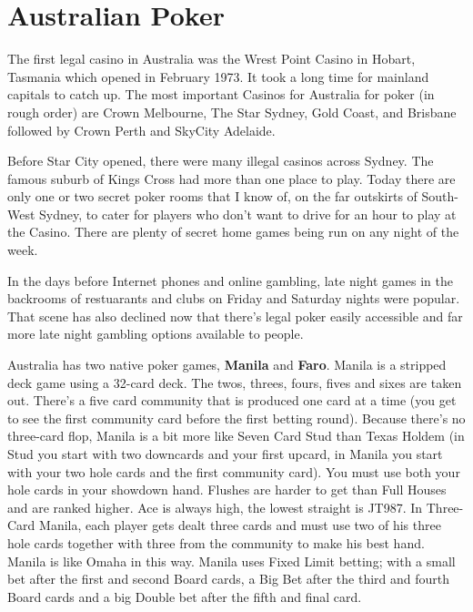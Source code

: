 \section{Australian Poker}

The first legal casino in Australia was the Wrest Point Casino in
Hobart, Tasmania which opened in February 1973. It took a long time
for mainland capitals to catch up. The most important Casinos for
Australia for poker (in rough order) are Crown Melbourne, The Star
Sydney, Gold Coast, and Brisbane followed by Crown Perth and SkyCity
Adelaide.


Before Star City opened, there were many illegal casinos across
Sydney. The famous suburb of Kings Cross had more than one place to
play. Today there are only one or two secret poker rooms that I know
of, on the far outskirts of South-West Sydney, to cater for players
who don't want to drive for an hour to play at the Casino. There are
plenty of secret home games being run on any night of the week.

In the days before Internet phones and online gambling, late night
games in the backrooms of restuarants and clubs on Friday and
Saturday nights were popular. That scene has also declined now that
there's legal poker easily accessible and far more late night gambling
options available to people.

Australia has two native poker games, \textbf{Manila} and
\textbf{Faro}. Manila is a stripped deck game using a 32-card
deck. The twos, threes, fours, fives and sixes are taken out.
There's a five card community that is produced one card at a time (you
get to see the first community card before the first betting round).
Because there's no three-card flop, Manila is a bit more like Seven
Card Stud than Texas Holdem (in Stud you start with two downcards and
your first upcard, in Manila you start with your two hole cards and
the first community card).
You must use both your hole cards in your showdown hand. Flushes are harder
to get than Full Houses and are ranked higher. Ace is always high, the
lowest straight is JT987. In Three-Card Manila,
each player gets dealt three cards and must use two of his three hole
cards together with three from the community to make his best
hand. Manila is like Omaha in this way. Manila uses Fixed Limit
betting; with a small bet after the first and second Board cards, a
Big Bet after the third and fourth Board cards and a big Double bet
after the fifth and final card.

